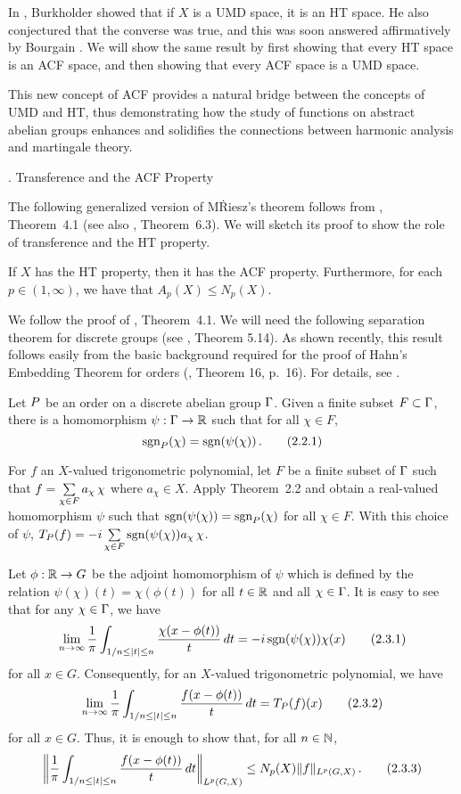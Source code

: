 In \cite{8}, Burkholder showed that if $X$ is a UMD space,
it is an HT space.  He also conjectured that the converse was
true, and this was soon answered affirmatively by Bourgain
\cite{6}.  We will show the same result by first showing
that every HT space is an ACF space, and then showing that
every ACF space is a UMD space.
 
This new concept of ACF provides a natural bridge 
between the concepts of 
UMD and HT, thus demonstrating how the study of functions on
abstract abelian groups enhances and solidifies the connections
between harmonic analysis and martingale theory.  
 
. Transference and the ACF Property
\endspecialhead
 
The following generalized version of M\. Riesz's theorem 
follows from \cite{5}, Theorem~4.1 
(see also \cite{2}, Theorem~6.3). 
We will sketch its proof to show the
role of transference and the HT property.  

 If $X$ has the 
HT property, then it
has the ACF property.  Furthermore, for each $p \in
(1,\infty)$, we have that
$A_p(X) \le N_p(X)$.
\endproclaim
 
We follow the proof of 
 \cite{5}, Theorem~4.1.  We will 
need the following separation theorem for discrete 
groups (see \cite{3}, Theorem 5.14).  
As shown recently,
this result follows easily from the basic background 
required for the proof of Hahn's Embedding Theorem for 
orders (\cite{12}, Theorem 16, p.\ 16).  
For details, see \cite{4}.
 
 Let $P$ be an order on a discrete
abelian group $\Gamma$. Given a finite subset
$F\subset\Gamma$, there is a homomorphism $\psi:\Gamma\to\Bbb R$
such that for all $\chi\in F$, $$\text{sgn}_P(\chi )=
\text{sgn}(\psi(\chi ))\,.  \tag{2.2.1}$$
\endproclaim
 
For $f$ an $X$-valued trigonometric polynomial, let $F$ be a 
finite subset of $\Gamma$ such that
$f=\sum\limits_{\chi\in F} a_\chi\,\chi $ where $a_\chi\in X$.
Apply  Theorem~2.2 and obtain a real-valued homomorphism
$\psi $ such that $ \text{sgn}(\psi(\chi ))=\text{sgn}_P(\chi ) $
for all $\chi\in F$. With this choice of $\psi$, $T_P(f)=-i 
\sum\limits_{\chi\in F}\text{sgn}(\psi(\chi))a_\chi\,\chi$.
 
Let $\phi:\Bbb R\to G$ be the adjoint homomorphism of $\psi$
which is defined by the relation
$\psi(\chi)(t)=\chi(\phi(t))$
for all $t\in\Bbb R$ and all $\chi\in\Gamma$. It is easy to see
that for any
$\chi\in\Gamma$, we have
$$\lim_{n\to\infty} {1\over \pi }\int_{1/n\le |t|\le n}{\chi(x-
\phi(t)) \over  t}\,dt=
     -i\,\text{sgn}(\psi(\chi))\chi(x) \tag{2.3.1}$$
for all $x\in G$. Consequently, for an $X$-valued trigonometric 
polynomial, we have
$$\lim_{n\to\infty} {1\over \pi }\int_{1/n\le |t|\le n}{ f(x-
\phi(t)) \over  t}\,dt=
T_P(f)(x)\tag{2.3.2}$$
for all $x\in G$. Thus, it is enough to
show that, for all $n\in\Bbb N$,
$$\bigg\| {1\over \pi}\int_{1/n\le |t|\le n}{f(x-\phi(t))\over
t}\,dt\bigg\|_{L^p(G,X)}\leq
N_p(X)\|f\|_{L^p(G,X)}\,.\tag{2.3.3}$$
 
